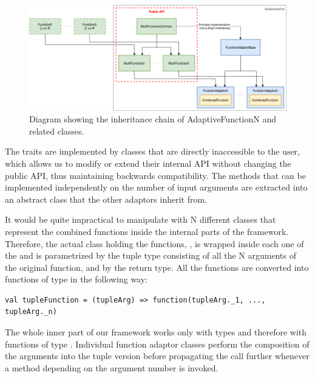 \begin{figure}[h!]
	\captionsetup{justification=centering,margin=0.5cm}
	\centerline{\mbox{\includegraphics[width=140mm]{./img/inheritance_function_adaptors.png}}}
	\caption{Diagram showing the inheritance chain of AdaptiveFunctionN and related classes.}
	\label{fig:inheritance_function_adaptors}
\end{figure}

The  traits are implemented by  classes that are directly inaccessible to the user, which allows us to modify or extend their internal API without changing the public API, thus maintaining backwards compatibility. The methods that can be implemented independently on the number of input arguments are extracted into an abstract class  that the other adaptors inherit from.

It would be quite impractical to manipulate with N different classes that represent the combined functions inside the internal parts of the framework. Therefore, the actual class holding the functions, , is wrapped inside each one of the  and is parametrized by the tuple type consisting of all the N arguments of the original function, and by the return type. All the functions are converted into functions of type  in the following way:

\lstset{style=Scala}
\begin{lstlisting}
val tupleFunction = (tupleArg) => function(tupleArg._1, ..., tupleArg._n)
\end{lstlisting}
	
The whole inner part of our framework works only with  types and therefore with functions of type . Individual function adaptor classes perform the composition of the arguments into the tuple version before propagating the call further whenever a method depending on the argument number is invoked.

